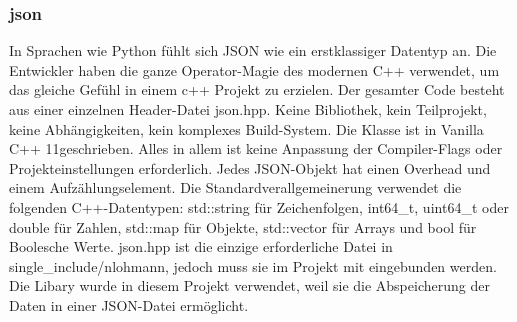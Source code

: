 \documentclass[a4paper,12pt]{article}
\begin{document}
\subsubsection{json}
In Sprachen wie Python fühlt sich JSON wie ein erstklassiger Datentyp an. 
Die Entwickler haben die ganze Operator-Magie des modernen C++ verwendet, um das gleiche Gefühl in einem c++ Projekt zu erzielen. 
Der gesamter Code besteht aus einer einzelnen Header-Datei json.hpp. Keine Bibliothek, kein Teilprojekt, keine Abhängigkeiten, kein komplexes Build-System. 
Die Klasse ist in Vanilla C++ 11geschrieben. Alles in allem ist keine Anpassung der Compiler-Flags oder Projekteinstellungen erforderlich.
Jedes JSON-Objekt hat einen Overhead und einem Aufzählungselement. Die Standardverallgemeinerung verwendet die folgenden C++-Datentypen: std::string für Zeichenfolgen, int64\_t, uint64\_t oder double für Zahlen, std::map für Objekte, std::vector für Arrays und bool für Boolesche Werte. 
json.hpp ist die einzige erforderliche Datei in single\_include/nlohmann, jedoch muss sie im Projekt mit eingebunden werden. 
Die Libary wurde in diesem Projekt verwendet, weil sie die Abspeicherung der Daten in einer JSON-Datei ermöglicht.
\end{document}
